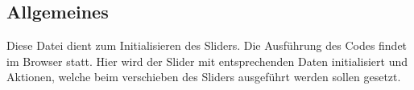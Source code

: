 \subsection{Allgemeines} Diese Datei dient zum Initialisieren des Sliders.
Die Ausführung des Codes findet im Browser statt. Hier wird der Slider mit entsprechenden Daten initialisiert und Aktionen, welche beim verschieben des Sliders ausgeführt werden sollen gesetzt.